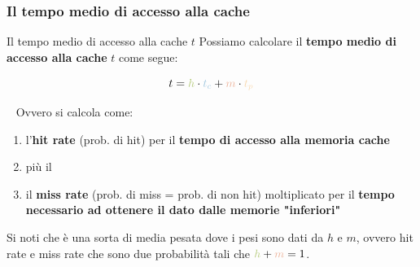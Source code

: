 \begin{frame}
	\frametitle{Il tempo medio di accesso alla cache}
	
	\begin{block}{Il tempo medio di accesso alla cache $t$}
	Possiamo calcolare il \textbf{tempo medio di accesso alla cache} $t$ come segue:\vspace{0.25em} \pause
		\begin{Large}
		$$t = {\color{CpuGreen}h} \cdot {\color{CpuBlue}t_c} + {\color{CpuRed}m} \cdot {\color{CpuPink}t_p}$$
		\end{Large}
		~\vspace{0.5em} \pause
		Ovvero si calcola come: \pause
		\begin{enumerate}
			\item l'{\color{CpuGreen}\textbf{hit rate}} (prob. di hit) per il {\color{CpuBlue}\textbf{tempo di accesso alla memoria cache}} \pause
			\item più il \pause
			\item il {\color{CpuRed}\textbf{miss rate}} (prob. di miss = prob. di non hit) moltiplicato per il {\color{CpuPink}\textbf{tempo necessario ad ottenere il dato dalle memorie "inferiori"}} \pause
		\end{enumerate}
		
		Si noti che è una sorta di media pesata dove i pesi sono dati da $h$ e $m$, ovvero hit rate e miss rate che sono due probabilità tali che ${\color{CpuGreen}h} + {\color{CpuRed}m} = 1$.
	\end{block}
	
\end{frame}


